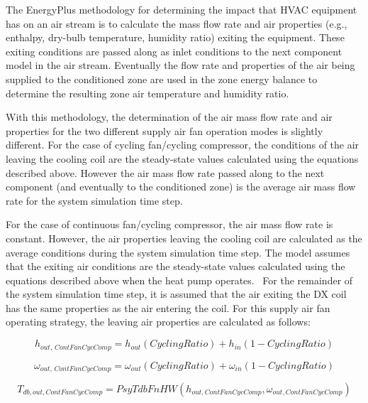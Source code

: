 The EnergyPlus methodology for determining the impact that HVAC equipment has on an air stream is to calculate the mass flow rate and air properties (e.g., enthalpy, dry-bulb temperature, humidity ratio) exiting the equipment. These exiting conditions are passed along as inlet conditions to the next component model in the air stream. Eventually the flow rate and properties of the air being supplied to the conditioned zone are used in the zone energy balance to determine the resulting zone air temperature and humidity ratio.

With this methodology, the determination of the air mass flow rate and air properties for the two different supply air fan operation modes is slightly different. For the case of cycling fan/cycling compressor, the conditions of the air leaving the cooling coil are the steady-state values calculated using the equations described above. However the air mass flow rate passed along to the next component (and eventually to the conditioned zone) is the average air mass flow rate for the system simulation time step.

For the case of continuous fan/cycling compressor, the air mass flow rate is constant. However, the air properties leaving the cooling coil are calculated as the average conditions during the system simulation time step. The model assumes that the exiting air conditions are the steady-state values calculated using the equations described above when the heat pump operates.~ For the remainder of the system simulation time step, it is assumed that the air exiting the DX coil has the same properties as the air entering the coil. For this supply air fan operating strategy, the leaving air properties are calculated as follows:

\begin{equation}
{h_{out,\,ContFanCycComp}} = {h_{out}}\left( {CyclingRatio} \right) + {h_{in}}\left( {1 - CyclingRatio} \right)
\end{equation}

\begin{equation}
{\omega_{out,\,ContFanCycComp}} = {\omega_{out}}\left( {CyclingRatio} \right) + {\omega_{in}}\left( {1 - CyclingRatio} \right)
\end{equation}

\begin{equation}
{T_{db,out,ContFanCycComp}} = PsyTdbFnHW\left( {{h_{out,ContFanCycComp}},{\omega_{out,ContFanCycComp}}} \right)
\end{equation}

